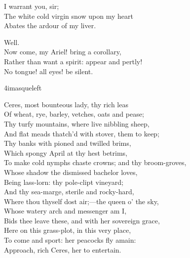 \begin{verse_speech}[Ferdinand] 
I warrant you, sir;\\
The white cold virgin snow upon my heart\\
Abates the ardour of my liver.
\end{verse_speech}

\begin{verse_speech}[Prospero] 
Well.\\
Now come, my Ariel! bring a corollary,\\
Rather than want a spirit: appear and pertly!\\
No tongue! all eyes! be silent.
\end{verse_speech}

	\begin{bwbigpic}
		[\picwidth]
		{4imasqueleft}
		{}
	\end{bwbigpic}


\begin{verse_speech}[Iris] 
Ceres, most bounteous lady, thy rich leas\\
Of wheat, rye, barley, vetches, oats and pease;\\
Thy turfy mountains, where live nibbling sheep,\\
And flat meads thatch'd with stover, them to keep;\\
Thy banks with pioned and twilled brims,\\
Which spongy April at thy hest betrims,\\
To make cold nymphs chaste crowns; and thy broom-groves,\\
Whose shadow the dismissed bachelor loves,\\
Being lass-lorn: thy pole-clipt vineyard;\\
And thy sea-marge, sterile and rocky-hard,\\
Where thou thyself dost air;—the queen o' the sky,\\
Whose watery arch and messenger am I,\\
Bids thee leave these, and with her sovereign grace,\\
Here on this grass-plot, in this very place,\\
To come and sport: her peacocks fly amain:\\
Approach, rich Ceres, her to entertain.
\end{verse_speech}

